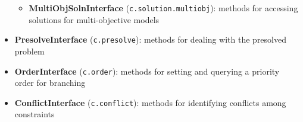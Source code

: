 \documentclass[12pt]{article}
\begin{document}
\begin{itemize}
\begin{itemize}
            \item \textbf{MultiObjSolnInterface} (\texttt{c.solution.multiobj}): methods for accessing solutions for multi-objective models %
        \end{itemize}
    \item \textbf{PresolveInterface} (\texttt{c.presolve}): methods for dealing with the presolved problem
    \item \textbf{OrderInterface} (\texttt{c.order}): methods for setting and querying a priority order for branching
    \item \textbf{ConflictInterface} (\texttt{c.conflict}): methods for identifying conflicts among constraints

\end{itemize}
\end{document}
